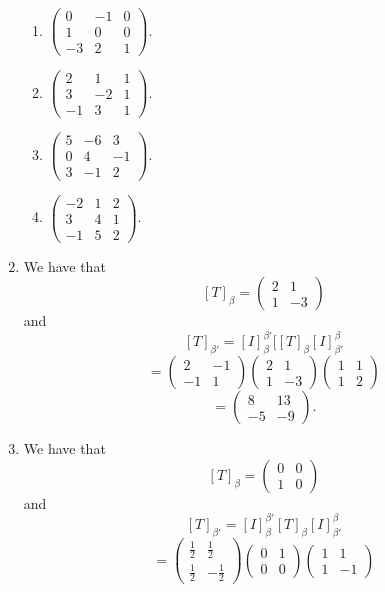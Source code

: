 \begin{enumerate}
\begin{enumerate}
\item $\left(\begin{array}{ccc}0&-1&0\\1&0&0\\-3&2&1\end{array}\right).$
\item $\left(\begin{array}{ccc}2&1&1\\3&-2&1\\-1&3&1\end{array}\right).$
\item $\left(\begin{array}{ccc}5&-6&3\\0&4&-1\\3&-1&2\end{array}\right).$
\item $\left(\begin{array}{ccc}-2&1&2\\3&4&1\\-1&5&2\end{array}\right).$
\end{enumerate}
\item We have that 
\[[T]_{\beta}=\left(\begin{array}{cc}2&1\\1&-3\end{array}\right)\]
and
\[[T]_{\beta'}=[I]_{\beta}^{\beta'}[[T]_{\beta}[I]_{\beta'}^{\beta}\]
\[=\left(\begin{array}{cc}2&-1\\-1&1\end{array}\right)\left(\begin{array}{cc}2&1\\1&-3\end{array}\right)\left(\begin{array}{cc}1&1\\1&2\end{array}\right)\]
\[=\left(\begin{array}{cc}8&13\\-5&-9\end{array}\right).\]
\item We have that 
\[[T]_{\beta}=\left(\begin{array}{cc}0&0\\1&0\end{array}\right)\]
and
\[[T]_{\beta'}=[I]_{\beta}^{\beta'}[T]_{\beta}[I]_{\beta'}^{\beta}\]
\[=\left(\begin{array}{cc}\frac{1}{2}&\frac{1}{2}\\\frac{1}{2}&-\frac{1}{2}\end{array}\right)\left(\begin{array}{cc}0&1\\0&0\end{array}\right)\left(\begin{array}{cc}1&1\\1&-1\end{array}\right)\]

\end{enumerate}
